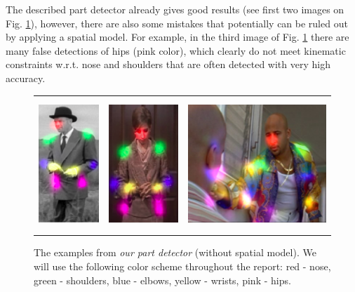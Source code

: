 \documentclass[a4paper,10pt]{article}
\begin{document}
	The described part detector already gives good results (see first two images on Fig. \ref{our_pd_examples}), however, there are also some mistakes that potentially can be ruled out by applying a spatial model. For example, in the third image of Fig. \ref{our_pd_examples} there are many false detections of hips (pink color), which clearly do not meet kinematic constraints w.r.t. nose and shoulders that are often detected with very high accuracy.
	\begin{figure}[H]
		\begin{tabular}{ccc}
			\includegraphics[height=5cm]{img/ex1.png} & 
			\includegraphics[height=5cm]{img/ex2.png} &
			\includegraphics[height=5cm]{img/ex3.png} 
			\caption{The examples from \textit{our part detector} (without spatial model). We will use the following color scheme throughout the report: red - nose, green - shoulders, blue - elbows, yellow - wrists, pink - hips. }
			\label{our_pd_examples}
		\end{tabular}
	\end{figure}
\end{document}
